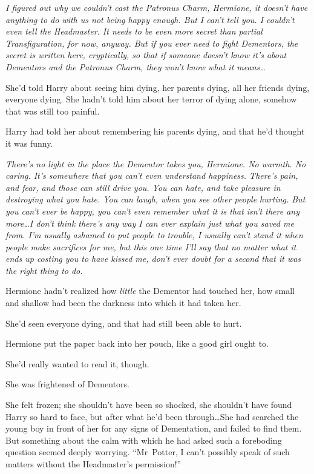 \emph{I figured out why we couldn’t cast the Patronus Charm, Hermione, it doesn’t have anything to do with us not being happy enough. But I can’t tell you. I couldn’t even tell the Headmaster. It needs to be even more secret than partial Transfiguration, for now, anyway. But if you ever need to fight Dementors, the secret is written here, cryptically, so that if someone doesn’t know it’s about Dementors and the Patronus Charm, they won’t know what it means…}

She’d told Harry about seeing him dying, her parents dying, all her friends dying, everyone dying. She hadn’t told him about her terror of dying alone, somehow that was still too painful.

Harry had told her about remembering his parents dying, and that he’d thought it was funny.

\emph{There’s no light in the place the Dementor takes you, Hermione. No warmth. No caring. It’s somewhere that you can’t even understand happiness. There’s pain, and fear, and those can still drive you. You can hate, and take pleasure in destroying what you hate. You can laugh, when you see other people hurting. But you can’t ever be happy, you can’t even remember what it is that isn’t there any more…I don’t think there’s any way I can ever explain just what you saved me from. I’m usually ashamed to put people to trouble, I usually can’t stand it when people make sacrifices for me, but this one time I’ll say that no matter what it ends up costing you to have kissed me, don’t ever doubt for a second that it was the right thing to do.}

Hermione hadn’t realized how \emph{little} the Dementor had touched her, how small and shallow had been the darkness into which it had taken her.

She’d seen everyone dying, and that had still been able to hurt.

Hermione put the paper back into her pouch, like a good girl ought to.

She’d really wanted to read it, though.

She was frightened of Dementors.


She felt frozen; she shouldn’t have been so shocked, she shouldn’t have found Harry so hard to face, but after what he’d been through…She had searched the young boy in front of her for any signs of Dementation, and failed to find them. But something about the calm with which he had asked such a foreboding question seemed deeply worrying.
“Mr~Potter, I can’t possibly speak of such matters without the Headmaster’s permission!”

